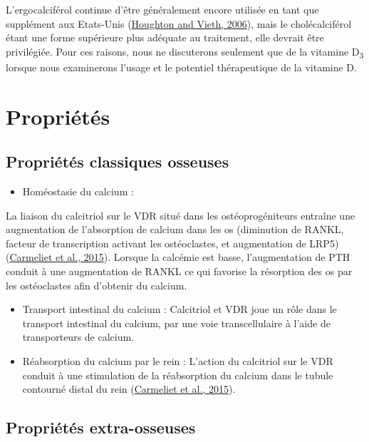 \documentclass[
  a4paper,
  DIV=11,
  numbers=noendperiod,
  listof=totoc]{scrreprt}
\providecommand{\tightlist}{%
  \setlength{\itemsep}{0pt}\setlength{\parskip}{0pt}}\usepackage{longtable,booktabs,array}
\begin{document}
L'ergocalciférol continue d'être généralement encore utilisée en tant
que supplément aux Etats-Unis
(\protect\hyperlink{ref-Houghton.2006}{Houghton and Vieth, 2006}), mais
le cholécalciférol étant une forme supérieure plus adéquate au
traitement, elle devrait être privilégiée. Pour ces raisons, nous ne
discuterons seulement que de la vitamine D\textsubscript{3} lorsque nous
examinerons l'usage et le potentiel thérapeutique de la vitamine D.

\hypertarget{propriuxe9tuxe9s}{%
\section{Propriétés}\label{propriuxe9tuxe9s}}

\hypertarget{propriuxe9tuxe9s-classiques-osseuses}{%
\subsection{Propriétés classiques
osseuses}\label{propriuxe9tuxe9s-classiques-osseuses}}

\begin{itemize}
\tightlist
\item
  Homéostasie du calcium :
\end{itemize}

La liaison du calcitriol sur le VDR situé dans les ostéoprogéniteurs
entraîne une augmentation de l'absorption de calcium dans les os
(diminution de RANKL, facteur de transcription activant les
ostéoclastes, et augmentation de LRP5)
(\protect\hyperlink{ref-Carmeliet.2015}{Carmeliet et al., 2015}).
Lorsque la calcémie est basse, l'augmentation de PTH conduit à une
augmentation de RANKL ce qui favorise la résorption des os par les
ostéoclastes afin d'obtenir du calcium.

\begin{itemize}
\item
  Transport intestinal du calcium : Calcitriol et VDR joue un rôle dans
  le transport intestinal du calcium, par une voie transcellulaire à
  l'aide de transporteurs de calcium.
\item
  Réabsorption du calcium par le rein : L'action du calcitriol sur le
  VDR conduit à une stimulation de la réabsorption du calcium dans le
  tubule contourné distal du rein
  (\protect\hyperlink{ref-Carmeliet.2015}{Carmeliet et al., 2015}).
\end{itemize}

\hypertarget{propriuxe9tuxe9s-extra-osseuses}{%
\subsection{Propriétés
extra-osseuses}\label{propriuxe9tuxe9s-extra-osseuses}}
\end{document}
